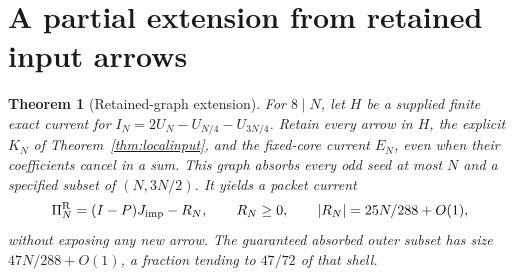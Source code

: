 \documentclass[11pt]{article}
\newtheorem{theorem}{Theorem}
\newcommand{\PiR}{\Pi^{\mathrm R}}
\begin{document}
\section{A partial extension from retained input arrows}

\begin{theorem}[Retained-graph extension]\label{thm:retained}
For $8\mid N$, let $H$ be a supplied finite exact current for
$I_N=2U_N-U_{N/4}-U_{3N/4}$. Retain every arrow in $H$, the explicit
$K_N$ of Theorem~\ref{thm:localinput}, and the fixed-core current $E_N$,
even when their coefficients cancel in a sum. This graph absorbs every
odd seed at most $N$ and a specified subset of $(N,3N/2)$.
It yields a packet current
\[
 \PiR_N=(I-P)J_{\rm imp}-R_N,\qquad R_N\ge0,
 \qquad |R_N|=25N/288+O(1),
\]
without exposing any new arrow. The guaranteed absorbed outer subset
has size $47N/288+O(1)$, a fraction tending to $47/72$ of that shell.
\end{theorem}
\end{document}
